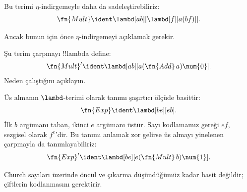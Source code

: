 \begin{editorial}
Bu terimi $\eta$-indirgemeyle daha da sadeleştirebiliriz:
\[
  \fn{Mult} \ident \lambd[ab][\lambd[f][a (b f)]].
\]

Ancak bunun için önce $\eta$-indirgemeyi açıklamak gerekir.
\end{editorial}

\begin{prob}
Şu terim çarpmayı !!{lambda define}:
\[
  \fn{Mult}' \ident \lambd[ab][a (\fn{Add}\, a) \num{0}].
\]
Neden çalıştığını açıklayın.
\end{prob}

Üs almanın $\lambd$-terimi olarak tanımı şaşırtıcı ölçüde basittir:
\[
  \fn{Exp} \ident \lambd[be][e b].
\]
İlk $b$ argümanı taban, ikinci $e$ argümanı üstür. Sayı kodlamamız gereği
$ef$, sezgisel olarak $f^e$'dir. Bu tanımı anlamak zor gelirse üs almayı
yinelenen çarpmayla da tanımlayabiliriz:
\[
  \fn{Exp}' \ident \lambd[be][e (\fn{Mult}\, b) \num{1}].
\]

Church sayıları üzerinde öncül ve çıkarma düşündüğümüz kadar basit değildir;
çiftlerin kodlanmasını gerektirir.

